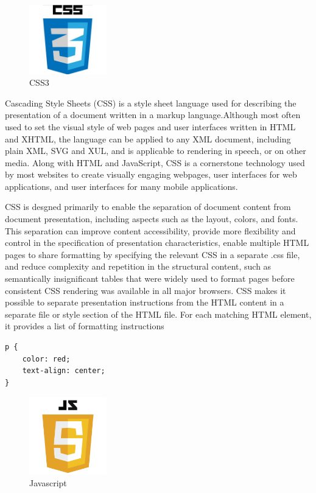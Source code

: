 \begin{figure}[!ht]
\centering
\includegraphics[width=0.3\textwidth]{input/images/CSS.jpg}                   
	\caption{CSS3}
\hspace{-1.5em}
\end{figure}
Cascading Style Sheets (CSS) is a style sheet language used for describing the presentation of a document written in a markup language.Although most often used to set the visual style of web pages and user interfaces written in HTML and XHTML, the language can be applied to any XML document, including plain XML, SVG and XUL, and is applicable to rendering in speech, or on other media. Along with HTML and JavaScript, CSS is a cornerstone technology used by most websites to create visually engaging webpages, user interfaces for web applications, and user interfaces for many mobile applications.


CSS is desgned primarily to enable the separation of document content from document presentation, including aspects such as the layout, colors, and fonts. This separation can improve content accessibility, provide more flexibility and control in the specification of presentation characteristics, enable multiple HTML pages to share formatting by specifying the relevant CSS in a separate .css file, and reduce complexity and repetition in the structural content, such as semantically insignificant tables that were widely used to format pages before consistent CSS rendering was available in all major browsers. CSS makes it possible to separate presentation instructions from the HTML content in a separate file or style section of the HTML file. For each matching HTML element, it provides a list of formatting instructions

\begin{verbatim}
p {
    color: red;
    text-align: center;
} 
\end{verbatim}
\begin{figure}[!ht]
\centering
\includegraphics[width=0.3\textwidth]{input/images/JS.png}
\caption{Javascript}
\hspace{-1.5em}
\end{figure}

